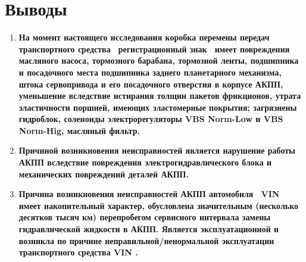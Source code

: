 \vspace{5mm}
\section{Выводы}

\begin{enumerate}
	\item \textbf{ На момент настоящего исследования  коробка перемены передач \, транспортного средства \, регистрационный знак \,
        имеет повреждения  масляного насоса, тормозного барабана, тормозной ленты, подшипника и посадочного места подшипника заднего планетарного механизма,  штока сервопривода и его посадочного отверстия в корпусе АКПП, уменьшение вследствие истирания толщин пакетов фрикционов, утрата эластичности поршней, имеющих эластомерные покрытия; загрязнены гидроблок, соленоиды электрорегуляторы VBS Norm-Low  и VBS Norm-Hig, масляный фильтр.  }
    \item \textbf{Причиной возникновения неисправностей является нарушение работы АКПП вследствие повреждения электрогидравлического блока и механических повреждений деталей АКПП.}
        \item \textbf{Причина возникновения неисправностей АКПП автомобиля \, VIN \,  имеет накопительный характер, обусловлена значительным (несколько десятков тысяч км) перепробегом сервисного интервала замены гидравлической жидкости в АКПП. Является  эксплуатационной и возникла по причине неправильной/ненормальной эксплуатации транспортного средства  VIN \vin.}
\end{enumerate}

\relax
{}
\vspace{15mm}

\vspace{15mm}

